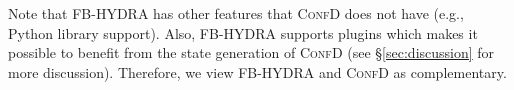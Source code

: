 Note that FB-HYDRA has other features that \textsc{ConfD} does not have (e.g., Python library support). Also, FB-HYDRA supports plugins which makes it possible to benefit from the state generation of \textsc{ConfD} (see \S\ref{sec:discussion} for more discussion).
Therefore, we view FB-HYDRA and \textsc{ConfD}  as complementary.
